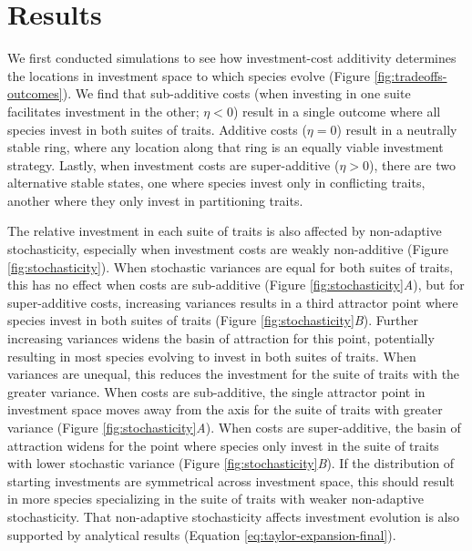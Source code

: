 \section*{Results}





We first conducted simulations to see how investment-cost additivity 
determines the locations in investment space to which species evolve
 (Figure \ref{fig:tradeoffs-outcomes}).
We find that sub-additive costs (when investing in one suite facilitates
investment in the other; $\eta < 0$) result in a single outcome where all 
species invest in both suites of traits.
Additive costs ($\eta = 0$) result in a neutrally stable ring, where
any location along that ring is an equally viable investment strategy.
Lastly, when investment costs are super-additive ($\eta > 0$), there are two
alternative stable states, one where species invest only in conflicting traits,
another where they only invest in partitioning traits.


The relative investment in each suite of traits is also affected by
non-adaptive stochasticity, especially when investment costs are weakly
non-additive (Figure \ref{fig:stochasticity}).
When stochastic variances are equal for both suites of traits, 
this has no effect when costs are sub-additive (Figure
\ref{fig:stochasticity}\textit{A}), but
for super-additive costs, increasing variances results in a third
attractor point where species invest in both suites of traits
(Figure \ref{fig:stochasticity}\textit{B}).
Further increasing variances widens the basin of attraction for this point,
potentially resulting in most species evolving to invest in both suites 
of traits.
When variances are unequal, this reduces the investment for the suite of traits 
with the greater variance.
When costs are sub-additive, the single attractor point in investment
space moves away from the axis for the suite of traits with greater variance 
(Figure \ref{fig:stochasticity}\textit{A}).
When costs are super-additive, the basin of attraction widens for the point
where species only invest in the suite of traits with lower stochastic variance
(Figure \ref{fig:stochasticity}\textit{B}).
If the distribution of starting investments are symmetrical across investment
space, this should result in more species specializing in the suite of traits
with weaker non-adaptive stochasticity.
That non-adaptive stochasticity affects investment evolution is also 
supported by analytical results (Equation \ref{eq:taylor-expansion-final}).


